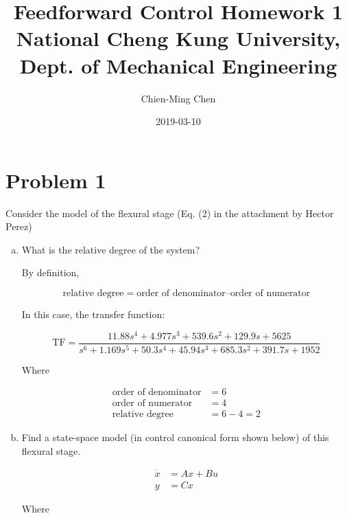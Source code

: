\documentclass[12pt]{article}
\title{Feedforward Control Homework 1 \\
  \large National Cheng Kung University, Dept. of Mechanical Engineering}
\date{2019-03-10}
\author{Chien-Ming Chen}
\begin{document}
  \maketitle

  \section{Problem 1}
  Consider the model of the flexural stage (Eq. (2) in the attachment by Hector Perez)

  \begin{enumerate}[(a)]
    \item What is the relative degree of the system?

    By definition,

    \begin{equation}
      \text{relative degree} = \text{order of denominator} – \text{order of numerator}
    \end{equation}

    In this case, the transfer function:

    \begin{equation}
      \text{TF} = \frac{11.88 s^4 + 4.977 s^3 + 539.6 s^2 + 129.9 s + 5625}{s^6 + 1.169 s^5 + 50.3 s^4 + 45.94 s^3 + 685.3 s^2 + 391.7 s + 1952}
    \end{equation}

    Where

    \begin{align*}
      \text{order of denominator} &= 6 \\
      \text{order of numerator} &= 4 \\
      \text{relative degree} &= 6 - 4 = 2
    \end{align*}

    \clearpage

    \item Find a state-space model (in control canonical form shown below) of this flexural stage.

    \begin{align*}
      \dot{x} &= Ax + Bu \\
      y &= Cx
    \end{align*}

    Where


\end{enumerate}
\end{document}
